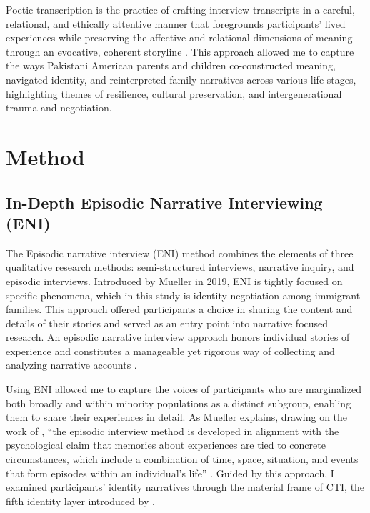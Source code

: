 Poetic transcription is the practice of crafting interview transcripts in a careful, relational, and ethically attentive manner that foregrounds participants’ lived experiences while preserving the affective and relational dimensions of meaning through an evocative, coherent storyline \citep{faulknerPoeticPortraitsOlder2026, faulknerComposingPoemsUsing2024, faulknerPoeticInquiryCraft2019}. This approach allowed me to capture the ways Pakistani American parents and children co-constructed meaning, navigated identity, and reinterpreted family narratives across various life stages, highlighting themes of resilience, cultural preservation, and intergenerational trauma and negotiation.

\section{Method}

\subsection{In-Depth Episodic Narrative Interviewing (ENI)}

The Episodic narrative interview (ENI) method combines the elements of three qualitative research methods: semi-structured interviews, narrative inquiry, and episodic interviews. Introduced by Mueller in 2019, ENI is tightly focused on specific phenomena, which in this study is identity negotiation among immigrant families. This approach offered participants a choice in sharing the content and details of their stories and served as an entry point into narrative focused research. An episodic narrative interview approach honors individual stories of experience and constitutes a manageable yet rigorous way of collecting and analyzing narrative accounts \citep{muellerEpisodicNarrativeInterview2019}.

Using ENI allowed me to capture the voices of participants who are marginalized both broadly and within minority populations as a distinct subgroup, enabling them to share their experiences in detail. As Mueller explains, drawing on the work of \citet{flickEpisodicInterviewSmall1997}, “the episodic interview method is developed in alignment with the psychological claim that memories about experiences are tied to concrete circumstances, which include a combination of time, space, situation, and events that form episodes within an individual’s life” \citep[p.~3-4]{muellerEpisodicNarrativeInterview2019}. Guided by this approach, I examined participants’ identity narratives through the material frame of CTI, the fifth identity layer introduced by \citep{kuiperCommunicationTheoryIdentity2021}.

